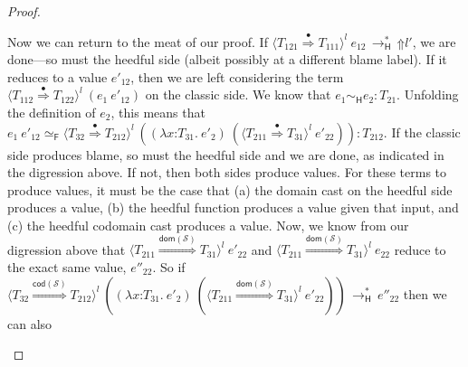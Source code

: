 \documentclass[9pt]{extarticle}
\newcommand{\ottnt}[1]{\mathit{#1}}
\begin{document}
{\begin{lemma}
\begin{proof}
{\begin{itemize}
\begin{itemize}
        Now we can return to the meat of our proof. If
        $ \langle  \ottnt{T_{{\mathrm{121}}}}  \mathord{ \overset{\bullet}{\Rightarrow} }  \ottnt{T_{{\mathrm{111}}}}  \rangle^{ \ottnt{l} } ~  \ottnt{e_{{\mathrm{12}}}}  \,  \longrightarrow ^{*}_{  \mathsf{H}  }  \,  \mathord{\Uparrow}  \ottnt{l'} $, we are done---so must
        the heedful side (albeit possibly at a different blame
        label). If it reduces to a value $\ottnt{e'_{{\mathrm{12}}}}$, then we are left
        considering the term $ \langle  \ottnt{T_{{\mathrm{112}}}}  \mathord{ \overset{\bullet}{\Rightarrow} }  \ottnt{T_{{\mathrm{122}}}}  \rangle^{ \ottnt{l} } ~   (  \ottnt{e_{{\mathrm{1}}}} ~ \ottnt{e'_{{\mathrm{12}}}}  )  $ on the
        classic side. We know that $ \ottnt{e_{{\mathrm{1}}}}   \sim _{  \mathsf{H}  }  \ottnt{e_{{\mathrm{2}}}}  :  \ottnt{T_{{\mathrm{21}}}} $. Unfolding the
        definition of $\ottnt{e_{{\mathrm{2}}}}$, this means that $  \ottnt{e_{{\mathrm{1}}}} ~ \ottnt{e'_{{\mathrm{12}}}}    \simeq _{  \mathsf{F}  }   \langle  \ottnt{T_{{\mathrm{32}}}}  \mathord{ \overset{\bullet}{\Rightarrow} }  \ottnt{T_{{\mathrm{212}}}}  \rangle^{ \ottnt{l} } ~   (   (  \lambda \mathit{x} \mathord{:} \ottnt{T_{{\mathrm{31}}}} .~  \ottnt{e'_{{\mathrm{2}}}}  )  ~  (  \langle  \ottnt{T_{{\mathrm{211}}}}  \mathord{ \overset{\bullet}{\Rightarrow} }  \ottnt{T_{{\mathrm{31}}}}  \rangle^{ \ottnt{l} } ~  \ottnt{e'_{{\mathrm{22}}}}  )   )    :  \ottnt{T_{{\mathrm{212}}}} $.
If the classic side produces blame, so must the heedful side
        and we are done, as indicated in the digression above. If not,
        then both sides produce values. For these terms to produce
        values, it must be the case that (a) the domain cast on the
        heedful side produces a value, (b) the heedful function
        produces a value given that input, and (c) the heedful
        codomain cast produces a value. Now, we know from our
        digression above that $ \langle  \ottnt{T_{{\mathrm{211}}}}  \mathord{ \overset{  \mathsf{dom} ( \mathcal{S} )  }{\Rightarrow} }  \ottnt{T_{{\mathrm{31}}}}  \rangle^{ \ottnt{l} } ~  \ottnt{e'_{{\mathrm{22}}}} $ and
        $ \langle  \ottnt{T_{{\mathrm{211}}}}  \mathord{ \overset{  \mathsf{dom} ( \mathcal{S} )  }{\Rightarrow} }  \ottnt{T_{{\mathrm{31}}}}  \rangle^{ \ottnt{l} } ~  \ottnt{e_{{\mathrm{22}}}} $ reduce to the exact same value,
        $\ottnt{e''_{{\mathrm{22}}}}$. So if $ \langle  \ottnt{T_{{\mathrm{32}}}}  \mathord{ \overset{  \mathsf{cod} ( \mathcal{S} )  }{\Rightarrow} }  \ottnt{T_{{\mathrm{212}}}}  \rangle^{ \ottnt{l} } ~   (   (  \lambda \mathit{x} \mathord{:} \ottnt{T_{{\mathrm{31}}}} .~  \ottnt{e'_{{\mathrm{2}}}}  )  ~  (  \langle  \ottnt{T_{{\mathrm{211}}}}  \mathord{ \overset{  \mathsf{dom} ( \mathcal{S} )  }{\Rightarrow} }  \ottnt{T_{{\mathrm{31}}}}  \rangle^{ \ottnt{l} } ~  \ottnt{e'_{{\mathrm{22}}}}  )   )   \,  \longrightarrow ^{*}_{  \mathsf{H}  }  \, \ottnt{e''_{{\mathrm{22}}}}$ then we can also

\end{itemize}
\end{itemize}}
\end{proof}
\end{lemma}}
\end{document}
